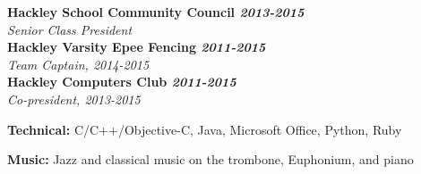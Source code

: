 \documentclass[10pt]{article}
\begin{document}
\begin{adjustwidth}{2.5em}{0pt}
{\bf Hackley School Community Council \hfill \sl 2013-2015} \\
{\sl Senior Class President} \\
{\bf Hackley Varsity Epee Fencing \hfill \sl 2011-2015} \\
{\sl Team Captain, 2014-2015} \\
{\bf Hackley Computers Club \hfill \sl 2011-2015} \\
{\sl Co-president, 2013-2015} \\
\end{adjustwidth}

\begin{adjustwidth}{2.5em}{0pt}
{\bf Technical:} C/C++/Objective-C, Java, Microsoft Office, Python, Ruby \\
\end{adjustwidth}

\begin{adjustwidth}{2.5em}{0pt}
 {\bf Music:} Jazz and classical music on the trombone, Euphonium, and piano \\
\end{adjustwidth}
\end{document}

